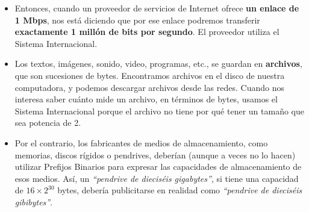 \documentclass[spanish,A4,]{article}
\begin{document}
\begin{itemize}
\itemsep1pt\parskip0pt
\item
  Entonces, cuando un proveedor de servicios de Internet ofrece
  \textbf{un enlace de 1 Mbps}, nos está diciendo que por ese enlace
  podremos transferir \textbf{exactamente 1 millón de bits por segundo}.
  El proveedor utiliza el Sistema Internacional.
\item
  Los textos, imágenes, sonido, video, programas, etc., se guardan en
  \textbf{archivos}, que son sucesiones de bytes. Encontramos archivos
  en el disco de nuestra computadora, y podemos descargar archivos desde
  las redes. Cuando nos interesa saber cuánto mide un archivo, en
  términos de bytes, usamos el Sistema Internacional porque el archivo
  no tiene por qué tener un tamaño que sea potencia de 2.
\item
  Por el contrario, los fabricantes de medios de almacenamiento, como
  memorias, discos rígidos o pendrives, deberían (aunque a veces no lo
  hacen) utilizar Prefijos Binarios para expresar las capacidades de
  almacenamiento de esos medios. Así, un \emph{``pendrive de dieciséis
  gigabytes''}, si tiene una capacidad de $16 \times 2^{30}$ bytes,
  debería publicitarse en realidad como \emph{``pendrive de dieciséis
  gibibytes''}.
\end{itemize}
\end{document}
